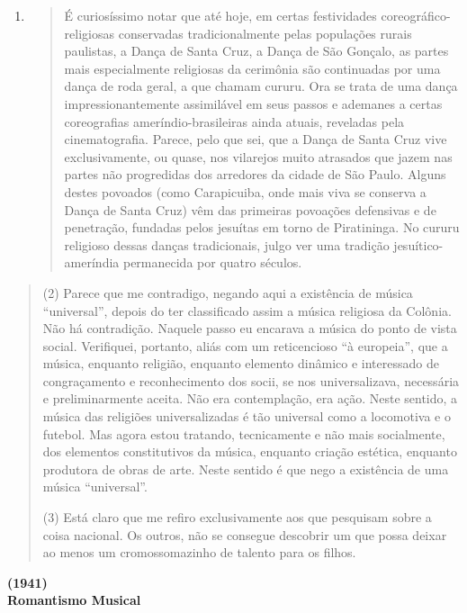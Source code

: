 \begin{enumerate}
\def\labelenumi{(\arabic{enumi})}
\item
  \begin{quote}
  É curiosíssimo notar que até hoje, em certas festividades
  coreográfico-religiosas conservadas tradicionalmente pelas populações
  rurais paulistas, a Dança de Santa Cruz, a Dança de São Gonçalo, as
  partes mais especialmente religiosas da cerimônia são continuadas por
  uma dança de roda geral, a que chamam cururu. Ora se trata de uma
  dança impressionantemente assimilável em seus passos e ademanes a
  certas coreografias ameríndio-brasileiras ainda atuais, reveladas pela
  cinematografia. Parece, pelo que sei, que a Dança de Santa Cruz vive
  exclusivamente, ou quase, nos vilarejos muito atrasados que jazem nas
  partes não progredidas dos arredores da cidade de São Paulo. Alguns
  destes povoados (como Carapicuiba, onde mais viva se conserva a Dança
  de Santa Cruz) vêm das primeiras povoações defensivas e de penetração,
  fundadas pelos jesuítas em torno de Piratininga. No cururu religioso
  dessas danças tradicionais, julgo ver uma tradição jesuítico-ameríndia
  permanecida por quatro séculos.
  \end{quote}
\end{enumerate}

\begin{quote}
(2) Parece que me contradigo, negando aqui a existência de música
``universal'', depois do ter classificado assim a música religiosa da
Colônia. Não há contradição. Naquele passo eu encarava a música do ponto
de vista social. Verifiquei, portanto, aliás com um reticencioso ``à
europeia'', que a música, enquanto religião, enquanto elemento dinâmico
e interessado de congraçamento e reconhecimento dos socii, se nos
universalizava, necessária e preliminarmente aceita. Não era
contemplação, era ação. Neste sentido, a música das religiões
universalizadas é tão universal como a locomotiva e o futebol. Mas agora
estou tratando, tecnicamente e não mais socialmente, dos elementos
constitutivos da música, enquanto criação estética, enquanto produtora
de obras de arte. Neste sentido é que nego a existência de uma música
``universal''.

(3) Está claro que me refiro exclusivamente aos que pesquisam sobre a
coisa nacional. Os outros, não se consegue descobrir um que possa deixar
ao menos um cromossomazinho de talento para os filhos.
\end{quote}

\textbf{(1941)}\\[2\baselineskip]\protect\hypertarget{xujf5md356km}{}{}\textbf{Romantismo
Musical}

